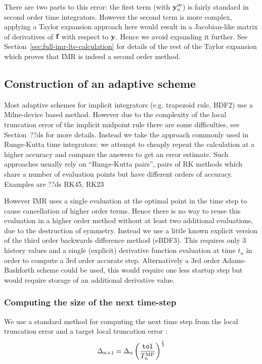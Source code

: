 There are two parts to this error: the first term (with $\mathbf{y}'''_n$) is fairly standard in second order time integrators.
However the second term is more complex, applying a Taylor expansion approach here would result in a Jacobian-like matrix of derivatives of ${\mathbf{f}}$ with respect to $\mathbf{y}$.
Hence we avoid expanding it further.
See Section~\ref{sec:full-imr-lte-calculation} for details of the rest of the Taylor expansion which proves that IMR is indeed a second order method.



\subsection{Construction of an adaptive scheme}

Most adaptive schemes for implicit integrators (e.g. trapezoid rule, BDF2) use a Milne-device based method.\cite{gresho-sani} %
However due to the complexity of the local truncation error of the implicit midpoint rule there are some difficulties, see Section~??ds for more details.
Instead we take the approach commonly used in Runge-Kutta time integrators: we attempt to cheaply repeat the calculation at a higher accuracy and compare the answers to get an error estimate.
Such approaches usually rely on ``Runge-Kutta pairs'', pairs of RK methods which share a number of evaluation points but have different orders of accuracy.
Examples are ??ds RK45, RK23 \cite{??ds}

However IMR uses a single evaluation at the optimal point in the time step to cause cancellation of higher order terms.
Hence there is no way to reuse this evaluation in a higher order method without at least two additional evaluations, due to the destruction of symmetry.
Instead we use a little known explicit version of the third order backwards difference method (eBDF3).
This requires only 3 history values and a single (explicit) derivative function evaluation at time $t_n$ in order to compute a 3rd order accurate step.
Alternatively a 3rd order Adams-Bashforth scheme could be used, this would require one less startup step but would require storage of an additional derivative value.




\subsubsection{Computing the size of the next time-step}

We use a standard method for computing the next time step from the local truncation error and a target local truncation error \toltt:\cite[pg.268]{Gresho-Sani}
\begin{equation}
\Delta_{n+1} = \Delta_{n} \left( \frac{{\textrm{\textup{\texttt{tol}}}}}{T_n^{\text{MP}}}  \right) ^{\frac{1}{3}}
\end{equation}



